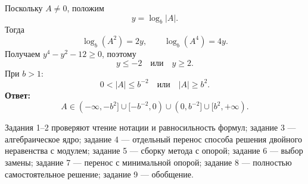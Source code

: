 \begin{teacheranswer}[Задание 9]
  Поскольку \(A\ne0\), положим
  \[
    y=\log_b|A|.
  \]
  Тогда
  \[
    \log_b(A^2)=2y,
    \qquad
    \log_b(A^4)=4y.
  \]
  Получаем \(y^4-y^2-12\ge0\), поэтому
  \[
    y\le-2\quad\text{или}\quad y\ge2.
  \]
  При \(b>1\):
  \[
    0<|A|\le b^{-2}
    \quad\text{или}\quad
    |A|\ge b^2.
  \]
  \textbf{Ответ:}
  \[
    A\in(-\infty,-b^2]
    \cup[-b^{-2},0)
    \cup(0,b^{-2}]
    \cup[b^2,+\infty).
  \]
\end{teacheranswer}

\begin{criterionbox}
  Задания 1--2 проверяют чтение нотации и равносильность формул; задание 3 ---
  алгебраическое ядро; задание 4 --- отдельный перенос способа решения
  двойного неравенства с модулем; задание 5 --- сборку метода с опорой;
  задание 6 --- выбор замены; задание 7 --- перенос с минимальной опорой;
  задание 8 --- полностью самостоятельное решение; задание 9 --- обобщение.
\end{criterionbox}
